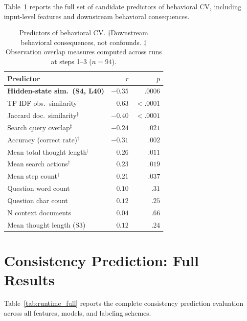 \documentclass{article}
\begin{document}
Table~\ref{tab:baselines_full} reports the full set of candidate predictors of behavioral CV, including input-level features and downstream behavioral consequences.

\begin{table}[ht]
\caption{Predictors of behavioral CV. $\dagger$Downstream behavioral consequences, not confounds. $\ddagger$Observation overlap measures computed across runs at steps 1--3 ($n = 94$).}
\label{tab:baselines_full}
\centering
\small
\begin{tabular}{lrr}
\toprule
Predictor & $r$ & $p$ \\
\midrule
\textbf{Hidden-state sim.\ (S4, L40)} & $\mathbf{-0.35}$ & $\mathbf{.0006}$ \\
\midrule
TF-IDF obs.\ similarity$^\ddagger$ & $-0.63$ & $< .0001$ \\
Jaccard doc.\ similarity$^\ddagger$ & $-0.40$ & $< .0001$ \\
Search query overlap$^\ddagger$ & $-0.24$ & $.021$ \\
\midrule
Accuracy (correct rate)$^\dagger$ & $-0.31$ & $.002$ \\
Mean total thought length$^\dagger$ & $0.26$ & $.011$ \\
Mean search actions$^\dagger$ & $0.23$ & $.019$ \\
Mean step count$^\dagger$ & $0.21$ & $.037$ \\
\midrule
Question word count & $0.10$ & $.31$ \\
Question char count & $0.12$ & $.25$ \\
N context documents & $0.04$ & $.66$ \\
Mean thought length (S3) & $0.12$ & $.24$ \\
\bottomrule
\end{tabular}
\end{table}

\section{Consistency Prediction: Full Results}
\label{app:runtime}

Table~\ref{tab:runtime_full} reports the complete consistency prediction evaluation across all features, models, and labeling schemes.
\end{document}
